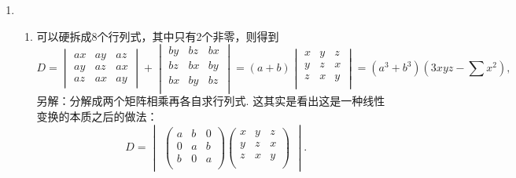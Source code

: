 \begin{enumerate}
          \item \begin{enumerate}
            \item 可以硬拆成8个行列式，其中只有2个非零，则得到
                  \[D=\begin{vmatrix}
                          ax & ay & az \\
                          ay & az & ax \\
                          az & ax & ay
                      \end{vmatrix}+\begin{vmatrix}
                          by & bz & bx \\
                          bz & bx & by \\
                          bx & by & bz \\
                      \end{vmatrix}=(a+b)\begin{vmatrix}
                          x & y & z \\
                          y & z & x \\
                          z & x & y \\
                      \end{vmatrix}=(a^3+b^3)(3xyz-\sum x^2),\]
                  另解：分解成两个矩阵相乘再各自求行列式. 这其实是看出这是一种线性变换的本质之后的做法：
                  \[D=\begin{vmatrix}
                          \begin{pmatrix}
                              a & b & 0 \\
                              0 & a & b \\
                              b & 0 & a \\
                          \end{pmatrix}
                          \begin{pmatrix}
                              x & y & z \\
                              y & z & x \\
                              z & x & y \\
                          \end{pmatrix}
                      \end{vmatrix}.\]


\end{enumerate}
\end{enumerate}
